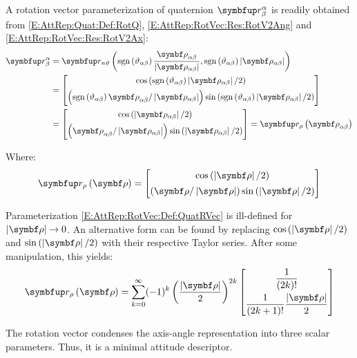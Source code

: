 A rotation vector parameterization of quaternion $\RotQ{\alpha}{\beta}$ is readily obtained from \eqref{E:AttRep:Quat:Def:RotQ}, \eqref{E:AttRep:RotVec:Res:RotV2Ang} and \eqref{E:AttRep:RotVec:Res:RotV2Ax}:
\begin{equation} \label{E:AttRep:RotVec:Res:RotV2RotQ}
	\begin{split}
		\RotQ{\alpha}{\beta} &= \RotQAxAng{\sign{\rel{\rotang}{\alpha}{\beta}} \frac{\rotv{\alpha}{\beta}}{\normrotv{\alpha}{\beta}}} {\sign{\rel{\rotang}{\alpha}{\beta}} \normrotv{\alpha}{\beta}}
		\\
		&= \qcol[1ex] 
		{\cos \left(\sign{\rel{\rotang}{\alpha}{\beta}} \normrotv{\alpha}{\beta} / 2 \right)}
		{\left( \sign{\rel{\rotang}{\alpha}{\beta}} \rotv{\alpha}{\beta} / \normrotv{\alpha}{\beta}  \right) \sin \left(  \sign{\rel{\rotang}{\alpha}{\beta}} \normrotv{\alpha}{\beta} / 2 \right)}
		\\
		&= \qcol[1ex] 
		{\cos \left( \normrotv{\alpha}{\beta} / 2 \right)}
		{\left(  \rotv{\alpha}{\beta} / \normrotv{\alpha}{\beta}  \right) \sin \left(  \normrotv{\alpha}{\beta} / 2 \right)} = \RotQRotV{\rotv{\alpha}{\beta}}
	\end{split}
\end{equation}

Where:
\begin{equation} \label{E:AttRep:RotVec:Def:QuatRVec}
	\RotQRotV{\mcol{\rotvecsymb}} = 
	\qcol[1ex] 
	{\cos \left( \norm{\mcol{\rotvecsymb}} / 2 \right)}
	{\left(  \mcol{\rotvecsymb} / \norm{\mcol{\rotvecsymb}} \right) \sin \left(  \norm{\mcol{\rotvecsymb}} / 2 \right)}
\end{equation}

Parameterization \eqref{E:AttRep:RotVec:Def:QuatRVec} is ill-defined for $\norm{\mcol{\rotvecsymb}} \to 0$. An alternative form can be found by replacing $\cos \left( \norm{\mcol{\rotvecsymb}} / 2 \right)$ and $\sin \left( \norm{\mcol{\rotvecsymb}} / 2 \right)$ with their respective Taylor series. After some manipulation, this yields:
\begin{equation} \label{E:AttRep:RotVec:Def:QuatRVecAlt}
	\RotQRotV{\mcol{\rotvecsymb}} = \sum^{\infty}_{k=0} (-1)^{k} \left( {\frac{\norm{\mcol{\rotvecsymb}}}{2}} \right)^{2k}
	\qcol[2ex]
	{\dfrac{1}{(2k)!}}
	{\dfrac{1}{(2k+1)!} \dfrac{\norm{\mcol{\rotvecsymb}}}{2}}
\end{equation}


The rotation vector condenses the axis-angle representation into three scalar parameters. Thus, it is a minimal attitude descriptor. 

